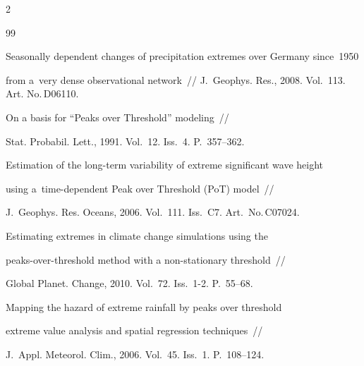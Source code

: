 \begin{multicols}{2}
{{\begin{thebibliography}{99}


Seasonally dependent changes of precipitation extremes over Germany since~1950 


from a~very dense observational network~// J.~Geophys. Res., 2008. Vol.~113. Art. No.\,D06110.







 On a basis for ``Peaks over Threshold'' modeling~// 


Stat. Probabil. Lett., 1991. Vol.~12. Iss.~4. P.~357--362.









Estimation of the long-term variability of extreme significant wave height 


using a~time-dependent Peak over Threshold (PoT) model~// 


J.~Geophys. Res. Oceans, 2006. Vol.~111. Iss.~C7. Art.\ No.\,C07024.









Estimating extremes in climate change simulations using the 


peaks-over-threshold method with a non-stationary threshold~// 


Global Planet. Change, 2010. Vol.~72. Iss.~1-2. P.~55--68.









Mapping the hazard of extreme rainfall by peaks over threshold 


extreme value analysis and spatial regression techniques~// 


J.~Appl. Meteorol. Clim., 2006. Vol.~45. Iss.~1. P.~108--124.







\end{thebibliography}}}
\end{multicols}
